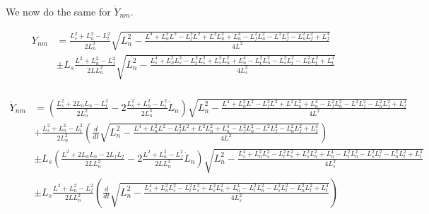 \documentclass[11pt, landscape]{article}
\begin{document}
We now do the same for $\dot{Y}_{nm}$.

\begin{align}
  Y_{nm} &= \frac{L_{s}^2+L_{n}^2-L_{t}^2}{2L^2_{n}} \sqrt{L_n^2-\frac{L^4 + L_n^2L^2 - L_f^2L^2 + L^2L_{n}^2 + L_{n}^4 - L_f^2L_{n}^2 - L^2L_{f}^2 - L_n^2L_{f}^2 + L_{f}^4}{4L^2}}\\
  &\pm L_s\frac{L^2+L_{n}^2-L_{f}^2}{2LL^2_{n}}\sqrt{L^2_n - \frac{L_{s}^4 + L_n^2L_{s}^2 - L_t^2L_{s}^2 + L_s^2L_{n}^2 + L_{n}^4 - L_t^2L_{n}^2 - L_s^2L_{t}^2 - L_n^2L_{t}^2 + L_{t}^4}{4L^2_{s}}}\\
\end{align}

\begin{align}
  \dot{Y}_{nm} &= \left(\frac{L_{s}^2+2L_{n}\dot{L}_n - L_{t}^2}{2L^2_{n}} - 2\frac{L_{s}^2+L_{n}^2-L_{t}^2}{2L^3_{n}}\dot{L}_n\right) \sqrt{L_n^2-\frac{L^4 + L_n^2L^2 - L_f^2L^2 + L^2L_{n}^2 + L_{n}^4 - L_f^2L_{n}^2 - L^2L_{f}^2 - L_n^2L_{f}^2 + L_{f}^4}{4L^2}}\\
  &+ \frac{L_{s}^2+L_{n}^2-L_{t}^2}{2L^2_{n}} \left(\frac{d}{dt} \sqrt{L_n^2-\frac{L^4 + L_n^2L^2 - L_f^2L^2 + L^2L_{n}^2 + L_{n}^4 - L_f^2L_{n}^2 - L^2L_{f}^2 - L_n^2L_{f}^2 + L_{f}^4}{4L^2}}\right)\\
  &\pm L_s\left(\frac{L^2+2L_{n}\dot{L}_n - 2L_{f}\dot{L}_f}{2LL^2_n} - 2\frac{L^2+L_{n}^2-L_{f}^2}{2LL^3_n}\dot{L}_n\right) \sqrt{L^2_n - \frac{L_{s}^4 + L_n^2L_{s}^2 - L_t^2L_{s}^2 + L_s^2L_{n}^2 + L_{n}^4 - L_t^2L_{n}^2 - L_s^2L_{t}^2 - L_n^2L_{t}^2 + L_{t}^4}{4L^2_{s}}}\\  
  &\pm L_s\frac{L^2+L_{n}^2-L_{f}^2}{2LL^2_{n}} \left(\frac{d}{dt} \sqrt{L^2_n - \frac{L_{s}^4 + L_n^2L_{s}^2 - L_t^2L_{s}^2 + L_s^2L_{n}^2 + L_{n}^4 - L_t^2L_{n}^2 - L_s^2L_{t}^2 - L_n^2L_{t}^2 + L_{t}^4}{4L^2_{s}}}\right)\\
\end{align}
\end{document}
